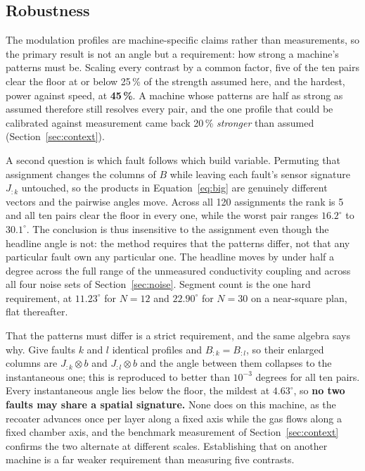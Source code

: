 \documentclass[final,5p,times,twocolumn]{elsarticle}
\begin{document}
\subsection{Robustness}
\label{sec:robust}

The modulation profiles are machine-specific claims rather than measurements, so
the primary result is not an angle but a requirement: how strong a machine's
patterns must be. Scaling every contrast by a common factor, five of the ten
pairs clear the floor at or below 25\,\% of the strength assumed here, and the
hardest, power against speed, at \textbf{45\,\%}. A machine whose patterns are
half as strong as assumed therefore still resolves every pair, and the one
profile that could be calibrated against measurement came back 20\,\%
\emph{stronger} than assumed (Section~\ref{sec:context}).

A second question is which fault follows which build variable. Permuting that
assignment changes the columns of $B$ while leaving each fault's sensor
signature $J_{:k}$ untouched, so the products in Equation~\eqref{eq:big} are
genuinely different vectors and the pairwise angles move. Across all 120
assignments the rank is 5 and all ten pairs clear the floor in every one, while
the worst pair ranges $16.2^\circ$ to $30.1^\circ$. The conclusion is thus
insensitive to the assignment even though the headline angle is not: the method
requires that the patterns differ, not that any particular fault own any
particular one. The headline moves by under half a degree across the full range
of the unmeasured conductivity coupling and across all four noise sets of
Section~\ref{sec:noise}. Segment count is the one hard requirement, at
$11.23^\circ$ for $N=12$ and $22.90^\circ$ for $N=30$ on a near-square plan,
flat thereafter.

That the patterns must differ is a strict requirement, and the same algebra says
why. Give faults $k$ and $l$ identical profiles and $B_{:k}=B_{:l}$, so their
enlarged columns are $J_{:k}\otimes b$ and $J_{:l}\otimes b$ and the angle
between them collapses to the instantaneous one; this is reproduced to better
than $10^{-3}$ degrees for all ten pairs. Every instantaneous angle lies below
the floor, the mildest at $4.63^\circ$, so \textbf{no two faults may share a
spatial signature.} None does on this machine, as the recoater advances once per
layer along a fixed axis while the gas flows along a fixed chamber axis, and the
benchmark measurement of Section~\ref{sec:context} confirms the two alternate at
different scales. Establishing that on another machine is a far weaker
requirement than measuring five contrasts.
\end{document}
